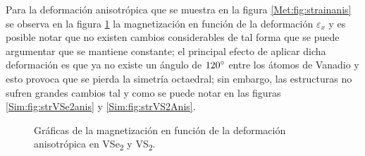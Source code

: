 \par Para la deformaci\'on anisotr\'opica que se muestra en la figura \ref{Met:fig:strainanis} se observa  en la figura \ref{Sim:fig:MgnVx2Anis} la magnetizaci\'on en funci\'on de la deformaci\'on $\varepsilon_x$  y es posible notar que no existen cambios considerables  de tal forma que se puede argumentar que se mantiene constante; el principal efecto de aplicar dicha deformaci\'on es que ya no existe un \'angulo de $120 \degree$ entre los \'atomos de Vanadio y esto provoca que se pierda la simetr\'ia octaedral; sin embargo, las estructuras no sufren grandes cambios tal y como se puede notar en las figuras \ref{Sim:fig:strVSe2anis} y \ref{Sim:fig:strVS2Anis}.
\begin{figure}[!hbt]
	\centering
	\caption[Magnetizaci\'on del VSe\textsubscript{2} y VS\textsubscript{2} bajo una deformaci\'on anisotr\'opica.]{Gr\'aficas de la magnetizaci\'on en funci\'on de la deformaci\'on anisotr\'opica en VSe\textsubscript{2} y VS\textsubscript{2}.}
	\label{Sim:fig:MgnVx2Anis}
\end{figure}
